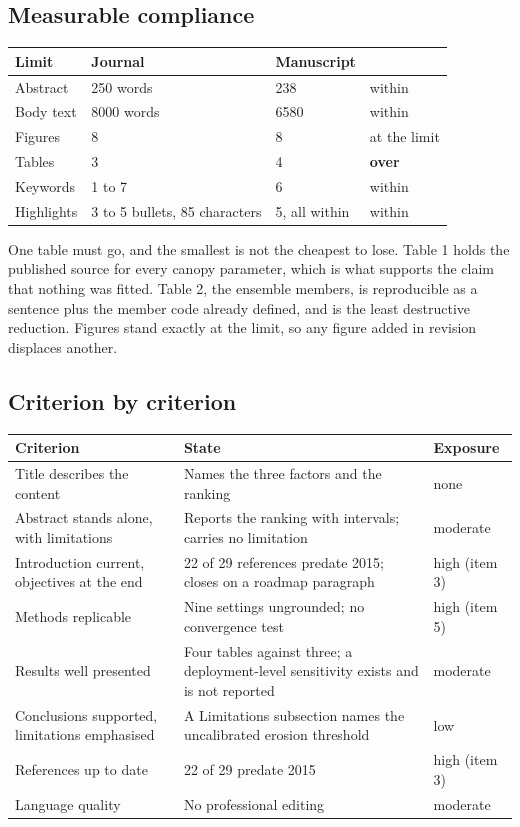 \documentclass[11pt]{article}
\begin{document}
\subsection{Measurable compliance}

\begin{center}
\begin{tabular}{llll}
\toprule
Limit & Journal & Manuscript & \\
\midrule
Abstract & 250 words & 238 & within \\
Body text & 8000 words & 6580 & within \\
Figures & 8 & 8 & at the limit \\
Tables & 3 & 4 & \textbf{over} \\
Keywords & 1 to 7 & 6 & within \\
Highlights & 3 to 5 bullets, 85 characters & 5, all within & within \\
\bottomrule
\end{tabular}
\end{center}

One table must go, and the smallest is not the cheapest to lose. Table 1 holds
the published source for every canopy parameter, which is what supports the claim
that nothing was fitted. Table 2, the ensemble members, is reproducible as a
sentence plus the member code already defined, and is the least destructive
reduction. Figures stand exactly at the limit, so any figure added in revision
displaces another.

\subsection{Criterion by criterion}

\begin{center}
\small
\begin{tabularx}{\textwidth}{lXl}
\toprule
Criterion & State & Exposure \\
\midrule
Title describes the content & Names the three factors and the ranking & none \\
Abstract stands alone, with limitations & Reports the ranking with intervals; carries no limitation & moderate \\
Introduction current, objectives at the end & 22 of 29 references predate 2015; closes on a roadmap paragraph & high (item 3) \\
Methods replicable & Nine settings ungrounded; no convergence test & high (item 5) \\
Results well presented & Four tables against three; a deployment-level sensitivity exists and is not reported & moderate \\
Conclusions supported, limitations emphasised & A Limitations subsection names the uncalibrated erosion threshold & low \\
References up to date & 22 of 29 predate 2015 & high (item 3) \\
Language quality & No professional editing & moderate \\
\bottomrule
\end{tabularx}
\end{center}
\end{document}
